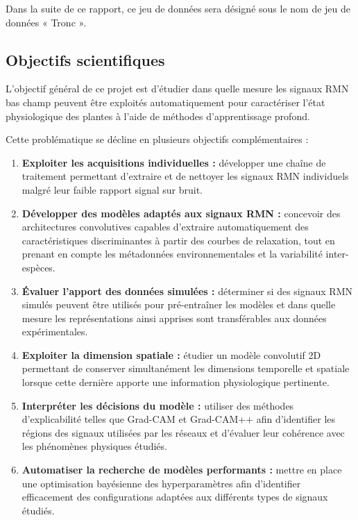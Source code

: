 \documentclass[12pt,a4paper,twoside]{article}
\begin{document}
Dans la suite de ce rapport, ce jeu de données sera désigné sous le nom de jeu de données « Tronc ».

\subsection{Objectifs scientifiques}
\label{subsec:objectifs_projet}

L'objectif général de ce projet est d'étudier dans quelle mesure les signaux
RMN bas champ peuvent être exploités automatiquement pour caractériser l'état
physiologique des plantes à l'aide de méthodes d'apprentissage profond.

Cette problématique se décline en plusieurs objectifs complémentaires :

\begin{enumerate}
    \item \textbf{Exploiter les acquisitions individuelles :}
    développer une chaîne de traitement permettant d'extraire et de nettoyer
    les signaux RMN individuels malgré leur faible rapport signal sur bruit.

    \item \textbf{Développer des modèles adaptés aux signaux RMN :}
    concevoir des architectures convolutives capables d'extraire
    automatiquement des caractéristiques discriminantes à partir des courbes
    de relaxation, tout en prenant en compte les métadonnées environnementales
    et la variabilité inter-espèces.

    \item \textbf{Évaluer l'apport des données simulées :}
    déterminer si des signaux RMN simulés peuvent être utilisés pour pré-entraîner
    les modèles et dans quelle mesure les représentations ainsi apprises sont
    transférables aux données expérimentales.

    \item \textbf{Exploiter la dimension spatiale :}
    étudier un modèle convolutif 2D permettant de conserver simultanément les
    dimensions temporelle et spatiale lorsque cette dernière apporte une
    information physiologique pertinente.

    \item \textbf{Interpréter les décisions du modèle :}
    utiliser des méthodes d'explicabilité telles que Grad-CAM et Grad-CAM++
    afin d'identifier les régions des signaux utilisées par les réseaux et
    d'évaluer leur cohérence avec les phénomènes physiques étudiés.

    \item \textbf{Automatiser la recherche de modèles performants :}
    mettre en place une optimisation bayésienne des hyperparamètres afin
    d'identifier efficacement des configurations adaptées aux différents types
    de signaux étudiés.
\end{enumerate}
\end{document}
